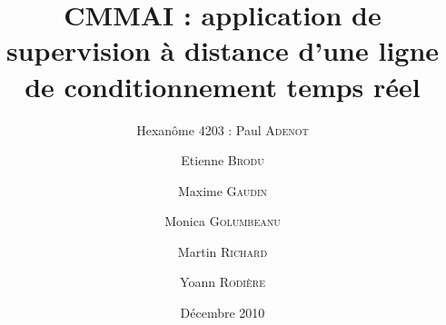 \documentclass[a4paper]{report}
\title{CMMAI : application de supervision à distance d'une ligne de conditionnement temps réel}
\date{Décembre 2010}
\author{Hexanôme 4203 : Paul \textsc{Adenot} \and Etienne \textsc{Brodu} \and
Maxime \textsc{Gaudin} \and Monica \textsc{Golumbeanu} \and Martin
\textsc{Richard} \and Yoann \textsc{Rodière}}
\begin{document}
\maketitle

\vfill
\pagebreak


	
	
\end{document}
